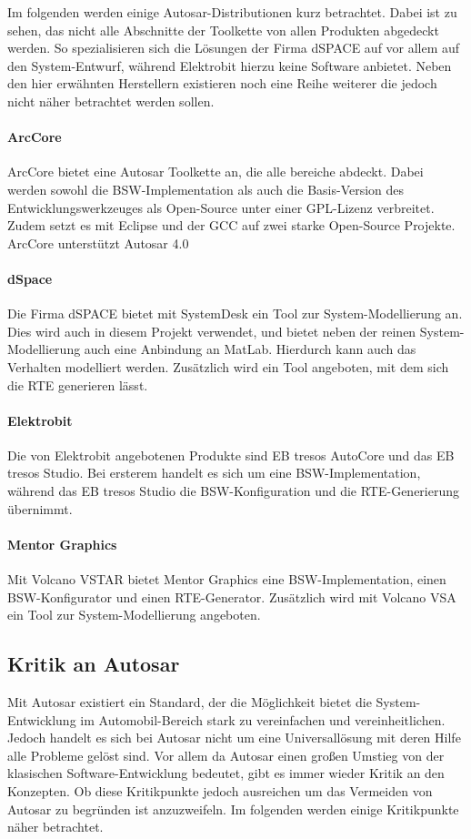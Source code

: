\documentclass[
  a4paper,					    %
  twoside,
  DIV=calc,     				%
  bibliography=totoc,
  cleardoublepage=empty,
  ngerman,     					%
  final       					%
]{scrbook}
\begin{document}
Im folgenden werden einige Autosar-Distributionen kurz betrachtet\cite{wiki:autosar}. Dabei ist zu sehen, das nicht alle Abschnitte der Toolkette von allen Produkten abgedeckt werden. So spezialisieren sich die Lösungen der Firma dSPACE auf vor allem auf den System-Entwurf, während Elektrobit hierzu keine Software anbietet. Neben den hier erwähnten Herstellern existieren noch eine Reihe weiterer die jedoch nicht näher betrachtet werden sollen.

\paragraph{ArcCore}
ArcCore bietet eine Autosar Toolkette an, die alle bereiche abdeckt. Dabei werden sowohl die BSW-Implementation als auch die Basis-Version des Entwicklungswerkzeuges als Open-Source unter einer GPL-Lizenz verbreitet. Zudem setzt es mit Eclipse und der GCC auf zwei starke Open-Source Projekte. ArcCore unterstützt Autosar 4.0

\paragraph{dSpace}
Die Firma dSPACE bietet mit SystemDesk ein Tool zur System-Modellierung an. Dies wird auch in diesem Projekt verwendet, und bietet neben der reinen System-Modellierung auch eine Anbindung an MatLab. Hierdurch kann auch das Verhalten modelliert werden. Zusätzlich wird ein Tool angeboten, mit dem sich die RTE generieren lässt.

\paragraph{Elektrobit}
Die von Elektrobit angebotenen Produkte sind EB tresos AutoCore und das EB tresos Studio. Bei ersterem handelt es sich um eine BSW-Implementation, während das EB tresos Studio die BSW-Konfiguration und die RTE-Generierung übernimmt.

\paragraph{Mentor Graphics}
Mit Volcano VSTAR bietet Mentor Graphics eine BSW-Implementation, einen BSW-Konfigurator und einen RTE-Generator. Zusätzlich wird mit Volcano VSA ein Tool zur System-Modellierung angeboten.




\subsection{Kritik an Autosar}
\label{sec:kritik_autosar}
Mit Autosar existiert ein Standard, der die Möglichkeit bietet die System-Entwicklung im Automobil-Bereich stark zu vereinfachen und vereinheitlichen. Jedoch handelt es sich bei Autosar nicht um eine Universallösung mit deren Hilfe alle Probleme gelöst sind. Vor allem da Autosar einen großen Umstieg von der klasischen Software-Entwicklung bedeutet, gibt es immer wieder Kritik an den Konzepten. Ob diese Kritikpunkte jedoch ausreichen um das Vermeiden von Autosar zu begründen ist anzuzweifeln. Im folgenden werden einige Kritikpunkte näher betrachtet.
\end{document}
